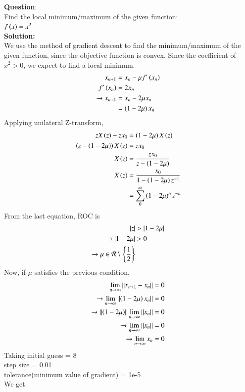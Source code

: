 \documentclass[journal]{IEEEtran}
\begin{document}
\textbf{Question}:\\
Find the local minimum/maximum of the given function:\\
$f\left(x\right) = x^2$
\\
\textbf{Solution: }\\
We use the method of gradient descent to find the minimum/maximum of the given function, since the objective function is convex.
Since the coefficient of $x^2 > 0$, we expect to find a local minimum.
\begin{align}
    x_{n+1} &= x_n - \mu f^{\prime}\left(x_n\right)\\
    f^{\prime}\left(x_n\right) &= 2x_n\\
    \xrightarrow{} x_{n+1} &= x_n - 2\mu x_n \\
    &= \left(1-2\mu\right)x_n
\end{align}
Applying unilateral Z-transform,
\begin{align}
    zX\left(z\right) - zx_0 &= \left(1-2\mu\right)X\left(z\right)\\
    \left(z - \left(1-2\mu\right)\right)X\left(z\right) &= zx_0\\
    X\left(z\right) &= \frac{zx_0}{z - \left(1-2\mu\right)}\\
    X\left(z\right) &= \frac{x_0}{1 - \left(1-2\mu\right)z^{-1}}\\
    &= \sum_{0}^{\infty} \left(1-2\mu\right)^n z^{-n}
\end{align}
From the last equation, ROC is 
\begin{align}
    |z| &> |1-2\mu|\\
    \xrightarrow{} |1-2\mu| &> 0\\
    \xrightarrow{} \mu \in \mathcal{R} \setminus \left\{\frac{1}{2}\right\}
\end{align}
Now, if $\mu$ satisfies the previous condition,
\begin{align}
    \lim_{n \to \infty} \left\lVert x_{n+1} - x_n\right\rVert = 0\\
    \xrightarrow{} \lim_{n \to \infty} \left\lVert\left(1-2\mu\right)x_n\right\rVert = 0\\
    \xrightarrow{} \left\lVert\left(1-2\mu\right)\right\rVert\lim_{n \to \infty} \left\lVert x_n\right\rVert = 0\\
    \xrightarrow{} \lim_{n \to \infty} \left\lVert x_n\right\rVert = 0\\
    \xrightarrow{} \lim_{n \to \infty} x_n = 0
\end{align}
Taking initial guess = 8\\ step size = 0.01\\ tolerance(minimum value of gradient) = 1e-5\\ We get \\
\end{document}
